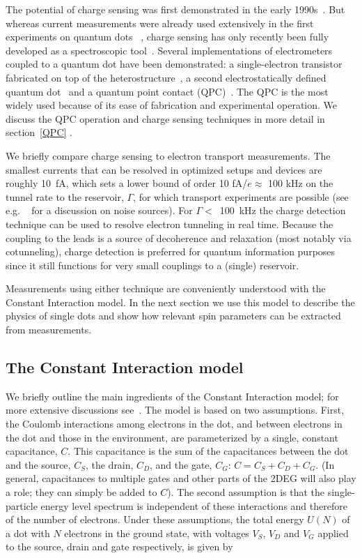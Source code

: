 \documentclass[12pt,aps,nofootinbib]{revtex4-1}
\begin{document}
The potential of charge sensing was first demonstrated in the
early 1990s~\cite{AshooriPRL92,FieldPRL93}. But whereas current
measurements were already used extensively in the first
experiments on quantum dots ~\cite{Kouwenhoven97}, charge sensing
has only recently been fully developed as a spectroscopic
tool~\cite{ElzermanAPL2004,JohnsonPRB2005}. Several
implementations of electrometers coupled to a quantum dot have
been demonstrated: a single-electron transistor fabricated on top
of the heterostructure~\cite{AshooriPRL92,Lu03a}, a second
electrostatically defined quantum
dot~\cite{HoffmanPRB1995,Fujisawa04a} and a quantum point contact
(QPC)~\cite{FieldPRL93,Sprinzak2002}. The QPC is the most widely
used because of its ease of fabrication and experimental
operation. We discuss the QPC operation and charge sensing
techniques in more detail in section~\ref{QPC} .

We briefly compare charge sensing to electron transport
measurements. The smallest currents that can be resolved in optimized setups and devices are roughly
10~fA, which sets a lower bound of order 10 fA/$e \approx$ 100 kHz on the
tunnel rate to the reservoir, $\Gamma$, for which transport
experiments are possible (see e.g. ~\textcite{VandersypenAPL2004} for a discussion on noise sources). For $\Gamma<$~100~kHz the charge detection technique can be used to resolve electron tunneling in
real time. Because the coupling to the leads is a source of
decoherence and relaxation (most notably via cotunneling), charge
detection is preferred for quantum information purposes since it
still functions for very small couplings to a (single) reservoir.

Measurements using either technique are conveniently understood
with the Constant Interaction model. In the next section we
use this model to describe the physics of single dots and show
how relevant spin parameters can be extracted from measurements.

\subsection{The Constant Interaction model}
\label{CImodel}
We briefly outline the main ingredients of the Constant Interaction model; for more
extensive discussions see~\textcite{kouwenhoven01,Beenakker,Kouwenhoven97}. The model is
based on two assumptions. First, the Coulomb interactions among
electrons in the dot, and between electrons in the dot and those
in the environment, are parameterized by a single, constant
capacitance, $C$. This capacitance is the sum of the capacitances
between the dot and the source, $C_S$, the drain, $C_D$, and the
gate, $C_G$: $C = C_S + C_D + C_G$. (In general, capacitances to
multiple gates and other parts of the 2DEG will also play a role;
they can simply be added to $C$). The second assumption is that
the single-particle energy level spectrum is independent of these
interactions and therefore of the number of electrons. Under these
assumptions, the total energy $U(N)$ of a dot with $N$ electrons
in the ground state, with voltages $V_{S}$, $V_D$ and $V_G$
applied to  the source, drain and gate respectively, is given by
\end{document}
